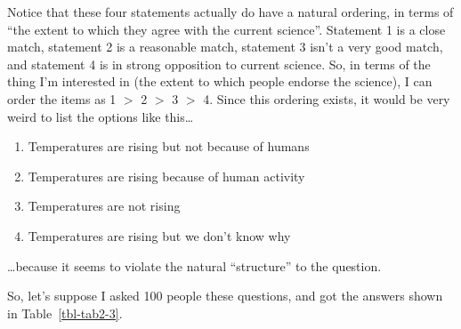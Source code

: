 \documentclass[
  letterpaper,
]{book}
\providecommand{\tightlist}{%
  \setlength{\itemsep}{0pt}\setlength{\parskip}{0pt}}\usepackage{longtable,booktabs,array}
\begin{document}
Notice that these four statements actually do have a natural ordering,
in terms of ``the extent to which they agree with the current science''.
Statement 1 is a close match, statement 2 is a reasonable match,
statement 3 isn't a very good match, and statement 4 is in strong
opposition to current science. So, in terms of the thing I'm interested
in (the extent to which people endorse the science), I can order the
items as 1 \(>\) 2 \(>\) 3 \(>\) 4. Since this ordering exists, it would
be very weird to list the options like this\ldots{}

\begin{enumerate}
\def\labelenumi{\arabic{enumi}.}
\tightlist
\item
  Temperatures are rising but not because of humans
\item
  Temperatures are rising because of human activity
\item
  Temperatures are not rising
\item
  Temperatures are rising but we don't know why
\end{enumerate}

\ldots because it seems to violate the natural ``structure'' to the
question.

So, let's suppose I asked 100 people these questions, and got the
answers shown in Table~\ref{tbl-tab2-3}.

\hypertarget{tbl-tab2-3}{}
 
  \providecommand{\huxb}[2]{\arrayrulecolor[RGB]{#1}\global\arrayrulewidth=#2pt}
  \providecommand{\huxvb}[2]{\color[RGB]{#1}\vrule width #2pt}
  \providecommand{\huxtpad}[1]{\rule{0pt}{#1}}
  \providecommand{\huxbpad}[1]{\rule[-#1]{0pt}{#1}}
\end{document}
